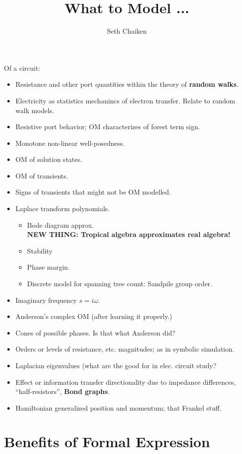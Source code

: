 \documentclass{article}
\title{What to Model ... }
\author{Seth Chaiken}
\begin{document}
\maketitle

Of a circuit:
\begin{itemize}
\item Resistance and other port quantities within the theory of 
\textbf{random walks}\cite{DoyleSnellRandom,ProbOnTreesNetworks}.
\item Electricity as statistics mechanincs of electron transfer.  Relate to 
random walk models.
\item Resistive port behavior; OM characterizes of 
forest term sign.
\item Monotone non-linear well-posedness.
\item OM of solution states.
\item OM of transients.
\item Signs of transients that might not be OM modelled.
\item Laplace transform polynomials.
\begin{itemize}
\item Bode diagram approx.\\
\textbf{NEW THING: Tropical algebra approximates real algebra!}
\item Stability
\item Phase margin.
\item Discrete model for spanning tree count: Sandpile group order.
\end{itemize}

\item Imaginary frequency $s=i\omega$.
\item Anderson's complex OM (after learning it properly.)
\item Cones of possible phases.  Is that what Anderson did?
\item Orders or levels of resistance, etc. magnitudes; as
in symbolic simulation.
\item Laplacian eigenvalues (what are the good for in elec. circuit
study?
\item Effect or information transfer directionality due to impedance
differences, ``half-resistors'',  \textbf{Bond graphs}.
\item Hamiltonian generalized position and momentum; that Frankel stuff.
\end{itemize}

\section{Benefits of Formal Expression}
\end{document}
